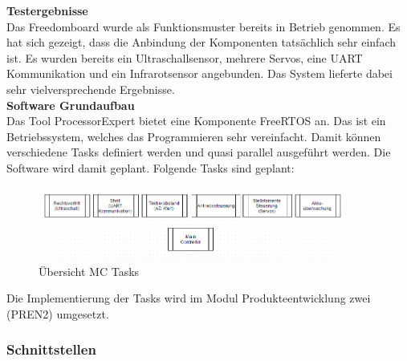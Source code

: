 \textbf{Testergebnisse}\\[0.2cm]
Das Freedomboard wurde als Funktionsmuster bereits in Betrieb genommen. Es hat sich gezeigt, dass die Anbindung der Komponenten tatsächlich sehr einfach ist. Es wurden bereits ein Ultraschallsensor, mehrere Servos, eine UART Kommunikation und ein Infrarotsensor angebunden. Das System lieferte dabei sehr vielversprechende Ergebnisse.\\[0.2cm]
\textbf{Software Grundaufbau}\\[0.2cm]
Das Tool ProcessorExpert bietet eine Komponente FreeRTOS an. Das ist ein Betriebssystem, welches das Programmieren sehr vereinfacht. Damit können verschiedene Tasks definiert werden und quasi parallel ausgeführt werden. Die Software wird damit geplant. Folgende Tasks sind geplant:
\begin{figure}[H]
	\centering
	\includegraphics[width=0.9\textwidth]{03_Loesungskonzept/pictures/MC_Tasks.png}
	\caption{Übersicht MC Tasks}
\end{figure}
Die Implementierung der Tasks wird im Modul Produkteentwicklung zwei (PREN2) umgesetzt.

\subsubsection{Schnittstellen}